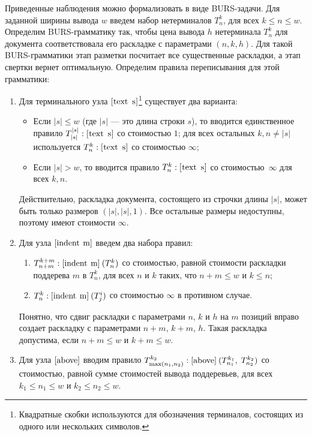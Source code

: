 Приведенные наблюдения можно формализовать в виде BURS-задачи.
Для заданной ширины вывода $w$ введем набор нетерминалов
$T_n^k$, для всех $k \le n \le w$. Определим BURS-грамматику так, чтобы цена вывода $h$ нетерминала
$T_n^k$ для документа соответствовала его раскладке с параметрами $(n, k, h)$.
Для такой BURS-грамматики этап разметки посчитает все существенные раскладки, а этап свертки
вернет оптимальную. Определим правила переписывания для этой грамматики:
\begin{enumerate}
\item Для терминального узла $[\mbox{\lstinline{text s}}]$\footnote{
  Квадратные скобки используются для обозначения терминалов, состоящих из одного
  или нескольких символов.}
  существует два варианта:
  \begin{itemize}
     \item Если $|s|\le w$ (где $|s|$ --- это длина строки $s$), то вводится единственное правило
           $T^{|s|}_{|s|}: [\mbox{\lstinline{text s}}]$ со стоимостью $1$;           
           для всех остальных
           $k, n\ne |s|$ используется $T^k_n:[\mbox{\lstinline{text s}}]$ со стоимостью $\infty$;
     \item Если $|s| > w$, то вводится правило $T^k_n:[\mbox{\lstinline{text s}}]$ со стоимостью\
       $\infty$ для всех $k, n$.
  \end{itemize}
  Действительно, раскладка документа, состоящего из строчки длины $|s|$, может быть только размеров
  $(|s|, |s|, 1)$. Все остальные размеры недоступны, поэтому имеют стоимости $\infty$.

\item Для узла $[\mbox{\lstinline{indent m}}]$ введем два набора правил:
  \begin{enumerate}
     \item $T^{k+m}_{n+m}:[\mbox{\lstinline{indent m}}]\:(T^k_n)$ со стоимостью,
       равной стоимости раскладки поддерева $m$ в $T_n^k$, для всех $n$ 
     и $k$ таких, что $n+m\le w$ и $k\le n$;
     \item $T^k_n:[\mbox{\lstinline{indent m}}]\:(T^i_j)$ со стоимостью $\infty$ в противном случае.
  \end{enumerate}
  Понятно, что сдвиг раскладки с параметрами $n$, $k$ и $h$ на $m$ позиций вправо
  создает раскладку с параметрами $n+m$, $k+m$, $h$. Такая раскладка допустима, если
  $n+m\le w$ и $k+m\le w$.

\item Для узла $[\mbox{\lstinline{above}}]$ вводим правило $T^{k_2}_{\max(n_1, n_2)}:[\mbox{\lstinline{above}}]\:(T^{k_1}_{n_1},\;T^{k_2}_{n_2})$ 
со стоимостью, равной сумме стоимостей вывода поддеревьев,
для всех $k_1\le n_1\le w$ и $k_2 \le n_2 \le w$.


\end{enumerate}

